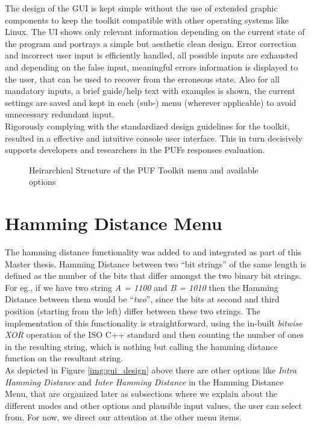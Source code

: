 The design of the GUI is kept simple without the use of extended graphic components to keep the toolkit compatible with other operating systems like Linux. The UI shows only relevant information depending on the current state of the program and portrays a simple but aesthetic clean design. Error correction and incorrect user input is efficiently handled, all possible inputs are exhausted and depending on the false input, meaningful errors information is displayed to the user, that can be used to
recover from the erroneous state. Also for all mandatory inputs, a brief guide/help text with examples is shown, the current settings are saved and kept in each (sub-) menu (wherever applicable) to avoid unnecessary redundant input.\\

Rigorously complying with the standardized design guidelines for the toolkit, resulted in a effective and intuitive console user interface.
This in turn decisively supports developers and researchers in the PUFs responses evaluation.\cite{71}

\begin{figure}
\centering
{}
\caption{Heirarchical Structure of the PUF Toolkit menu and available options}
\label{img:puf_menu}
\end{figure}

\section{Hamming Distance Menu}
\label{Hamming_Distance_menu}
The hamming distance functionality was added to and integrated as part of this Master thesis. Hamming Distance between two ``bit strings'' of the same length is defined as the number of the bits that differ amongst the two binary bit strings. For eg., if we have two string \emph{A = 1100} and \emph{B = 1010} then the Hamming Distance between them would be ``\emph{two}'', since the bits at second and third position (starting from the left) differ between these two strings. The implementation of
this functionality is straightforward, using the in-built \emph{bitwise XOR} operation of the ISO C++ standard and then counting the number of ones in the resulting string, which is nothing but calling the hamming distance function on the resultant string.\\

As depicted in Figure \ref{img:gui_design} above there are other options like \emph{Intra Hamming Distance} and \emph{Inter Hamming Distance} in the Hamming Distance Menu, that are organized later as subsections where we explain about the different modes and other options and plausible input values, the user can select from. For now, we direct our attention at the other menu items.\\

